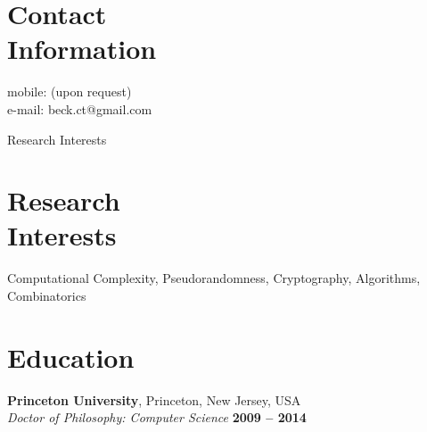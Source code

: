\documentclass[margin,line]{resume}
\begin{document}
\begin{resume}

    \section{\mysidestyle Contact\\Information}

                                                          \hfill mobile: (upon request)          \vspace{0mm}\\\vspace{0mm}%
                                                          \hfill e-mail: beck.ct@gmail.com  \vspace{0mm}\\\vspace{-4.5mm}%


    Research Interests
    \section{\mysidestyle Research\\Interests}

    Computational Complexity, Pseudorandomness, Cryptography, Algorithms, Combinatorics \\ 


    \section{\mysidestyle Education}

    \textbf{Princeton University}, Princeton, New Jersey, USA \vspace{2mm}\\\vspace{1mm}%
    \textsl{Doctor of Philosophy: Computer Science} \hfill \textbf{ 2009 -- 2014 }\vspace{-3mm}\\\vspace{-1mm}%


\end{resume}
\end{document}
